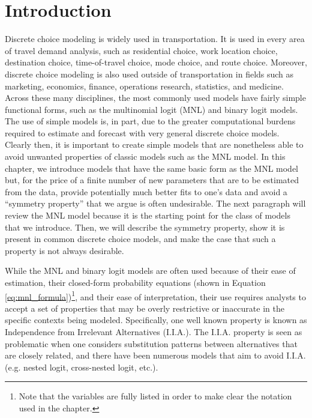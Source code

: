 \section{Introduction}
\label{sec:intro}
Discrete choice modeling is widely used in transportation. It is used in every area of travel demand analysis, such as residential choice, work location choice, destination choice, time-of-travel choice, mode choice, and route choice. Moreover, discrete choice modeling is also used outside of transportation in  fields such as marketing, economics, finance, operations research, statistics, and medicine. Across these many disciplines, the most commonly used models have fairly simple functional forms, such as the multinomial logit (MNL) and binary logit models. The use of simple models is, in part, due to the greater computational burdens required to estimate and forecast with very general discrete choice models. Clearly then, it is important to create simple models that are nonetheless able to avoid unwanted properties of classic models such as the MNL model. In this chapter, we introduce models that have the same basic form as the MNL model but, for the price of a finite number of new parameters that are to be estimated from the data, provide potentially much better fits to one's data and avoid a ``symmetry property'' that we argue is often undesirable. The next paragraph will review the MNL model because it is the starting point for the class of models that we introduce. Then, we will describe the symmetry property, show it is present in common discrete choice models, and make the case that such a property is not always desirable.

While the MNL and binary logit models are often used because of their ease of estimation, their closed-form probability equations (shown in Equation \ref{eq:mnl_formula})\footnote{Note that the variables are fully listed in order to make clear the notation used in the chapter.}, and their ease of interpretation, their use requires analysts to accept a set of properties that may be overly restrictive or inaccurate in the specific contexts being modeled. Specifically, one well known property is known as Independence from Irrelevant Alternatives (I.I.A.). The I.I.A. property is seen as problematic when one considers substitution patterns between alternatives that are closely related, and there have been numerous models that aim to avoid I.I.A. (e.g. nested logit, cross-nested logit, etc.).

